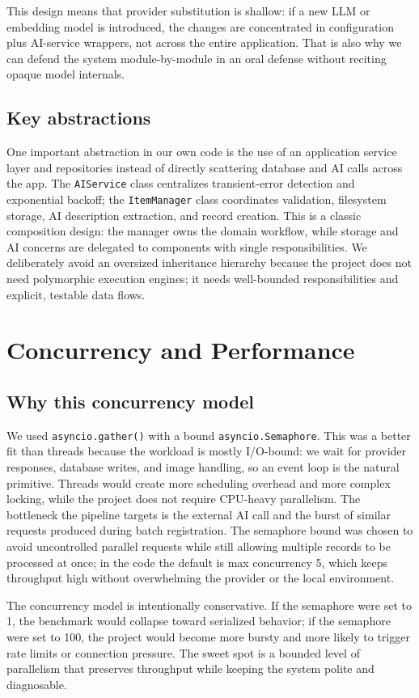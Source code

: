 \documentclass[11pt,a4paper]{article}
\begin{document}
This design means that provider substitution is shallow: if a new LLM or embedding model is introduced, the changes are concentrated in configuration plus AI-service wrappers, not across the entire application. That is also why we can defend the system module-by-module in an oral defense without reciting opaque model internals.

\subsection{Key abstractions}
One important abstraction in our own code is the use of an application service layer and repositories instead of directly scattering database and AI calls across the app. The \texttt{AIService} class centralizes transient-error detection and exponential backoff; the \texttt{ItemManager} class coordinates validation, filesystem storage, AI description extraction, and record creation. This is a classic composition design: the manager owns the domain workflow, while storage and AI concerns are delegated to components with single responsibilities. We deliberately avoid an oversized inheritance hierarchy because the project does not need polymorphic execution engines; it needs well-bounded responsibilities and explicit, testable data flows.

\section{Concurrency and Performance}
\subsection{Why this concurrency model}
We used \texttt{asyncio.gather()} with a bound \texttt{asyncio.Semaphore}. This was a better fit than threads because the workload is mostly I/O-bound: we wait for provider responses, database writes, and image handling, so an event loop is the natural primitive. Threads would create more scheduling overhead and more complex locking, while the project does not require CPU-heavy parallelism. The bottleneck the pipeline targets is the external AI call and the burst of similar requests produced during batch registration. The semaphore bound was chosen to avoid uncontrolled parallel requests while still allowing multiple records to be processed at once; in the code the default is max concurrency 5, which keeps throughput high without overwhelming the provider or the local environment.

The concurrency model is intentionally conservative. If the semaphore were set to 1, the benchmark would collapse toward serialized behavior; if the semaphore were set to 100, the project would become more bursty and more likely to trigger rate limits or connection pressure. The sweet spot is a bounded level of parallelism that preserves throughput while keeping the system polite and diagnosable.
\end{document}
